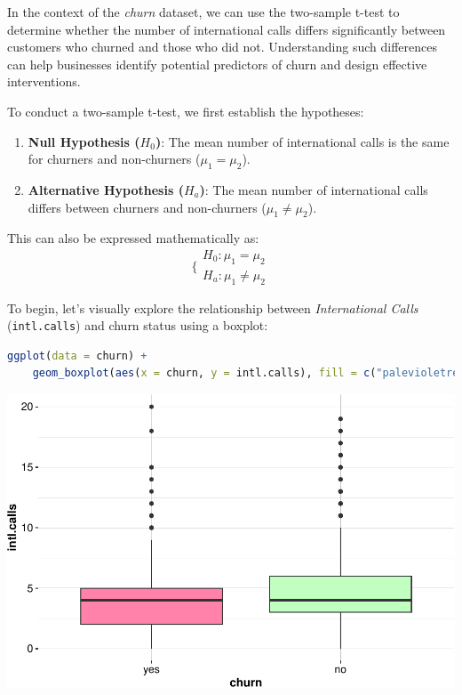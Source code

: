 \documentclass[
]{book}
\newcommand{\passthrough}[1]{#1}
\providecommand{\tightlist}{%
  \setlength{\itemsep}{0pt}\setlength{\parskip}{0pt}}
\theoremstyle{definition}
\theoremstyle{definition}
\theoremstyle{definition}
\theoremstyle{definition}
\theoremstyle{remark}
\begin{document}
In the context of the \emph{churn} dataset, we can use the two-sample t-test to determine whether the number of international calls differs significantly between customers who churned and those who did not. Understanding such differences can help businesses identify potential predictors of churn and design effective interventions.

To conduct a two-sample t-test, we first establish the hypotheses:

\begin{enumerate}
\def\labelenumi{\arabic{enumi}.}
\tightlist
\item
  \textbf{Null Hypothesis (\(H_0\))}: The mean number of international calls is the same for churners and non-churners (\(\mu_1 = \mu_2\)).
\item
  \textbf{Alternative Hypothesis (\(H_a\))}: The mean number of international calls differs between churners and non-churners (\(\mu_1 \neq \mu_2\)).
\end{enumerate}

This can also be expressed mathematically as:
\[
\bigg\{
\begin{matrix}
    H_0: \mu_1 = \mu_2   \\
    H_a: \mu_1 \neq \mu_2 
\end{matrix}
\]

To begin, let's visually explore the relationship between \emph{International Calls} (\passthrough{\lstinline!intl.calls!}) and churn status using a boxplot:

\begin{lstlisting}[language=R]
ggplot(data = churn) +
    geom_boxplot(aes(x = churn, y = intl.calls), fill = c("palevioletred1", "darkseagreen1"))
\end{lstlisting}

\begin{center}\includegraphics{statistics_files/figure-latex/unnamed-chunk-9-1} \end{center}
\end{document}
